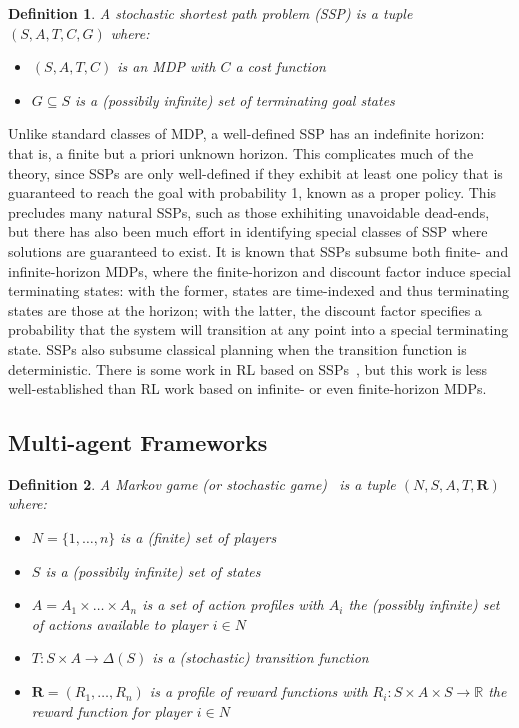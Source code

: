 \documentclass[10pt]{article}
\theoremstyle{plain}
\newtheorem{definition}{Definition}
\newcommand{\vect}[1]{\bm{#1}}
\begin{document}
\begin{definition}
    A stochastic shortest path problem (SSP) is a tuple $(S, A, T, C, G)$ where:
    \begin{itemize}
        \item $(S, A, T, C)$ is an MDP with $C$ a cost function
        \item $G \subseteq S$ is a (possibily infinite) set of terminating goal states
    \end{itemize}
\end{definition}

Unlike standard classes of MDP, a well-defined SSP has an indefinite horizon: that is, a finite but a priori unknown horizon.
This complicates much of the theory, since SSPs are only well-defined if they exhibit at least one policy that is guaranteed to reach the goal with probability 1, known as a proper policy.
This precludes many natural SSPs, such as those exhihiting unavoidable dead-ends, but there has also been much effort in identifying special classes of SSP where solutions are guaranteed to exist.
It is known that SSPs subsume both finite- and infinite-horizon MDPs, where the finite-horizon and discount factor induce special terminating states: with the former, states are time-indexed and thus terminating states are those at the horizon; with the latter, the discount factor specifies a probability that the system will transition at any point into a special terminating state.
SSPs also subsume classical planning when the transition function is deterministic.
There is some work in RL based on SSPs~\cite{Neu:AISTATS:2012}, but this work is less well-established than RL work based on infinite- or even finite-horizon MDPs.

\subsection{Multi-agent Frameworks}

\begin{definition}
    A Markov game (or stochastic game)~\cite{Shapley:PNAS:1953} is a tuple $(N, S, A, T, \vect{R})$ where:
    \begin{itemize}
        \item $N = \{ 1, \dots, n \}$ is a (finite) set of players
        \item $S$ is a (possibily infinite) set of states
        \item $A = A_{1} \times \dots \times A_{n}$ is a set of action profiles with $A_{i}$ the (possibly infinite) set of actions available to player $i \in N$
        \item $T : S \times A \to \Delta(S)$ is a (stochastic) transition function
        \item $\vect{R} = (R_{1}, \dots, R_{n})$ is a profile of reward functions with $R_{i} : S \times A \times S \to \mathbb{R}$ the reward function for player $i \in N$
    \end{itemize}
\end{definition}
\end{document}
